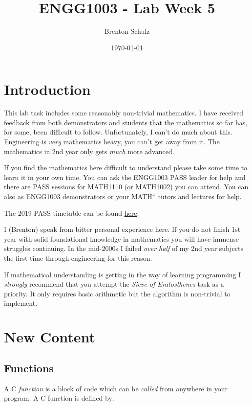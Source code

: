 \documentclass{lab}
\title{ENGG1003 - Lab Week 5}
\author{Brenton Schulz}
\date{\today}
\begin{document}
\maketitle

\section{Introduction}

This lab task includes some reasonably non-trivial mathematics. I have received feedback from both demonstrators and students that the mathematics so far has, for some, been difficult to follow. Unfortunately, I can't do much about this. Engineering is \textit{very} mathematics heavy, you can't get away from it. The mathematics in 2nd year only gets \textit{much} more advanced.

If you find the mathematics here difficult to understand please take some time to learn it in your own time. You can ask the ENGG1003 PASS leader for help and there are PASS sessions for MATH1110 (or MATH1002) you can attend. You can also as ENGG1003 demonstrators or your MATH* tutors and lectures for help.

The 2019 PASS timetable can be found \underline{\href{https://www.newcastle.edu.au/__data/assets/pdf_file/0003/137577/PASS-TT-Callaghan-S1-19.pdf}{here}}.

I (Brenton) speak from bitter personal experience here. If you do not finish 1st year with solid foundational knowledge in mathematics you will have immense struggles continuing. In the mid-2000s I failed \textit{over half} of my 2nd year subjects the first time through engineering for this reason.

If mathematical understanding is getting in the way of learning programming I \textit{strongly} recommend that you attempt the \textit{Sieve of Eratosthenes} task as a priority. It only requires basic arithmetic but the algorithm is non-trivial to implement.%

\pagebreak
\section{New Content}

\subsection{Functions}

A C \textit{function} is a block of code which can be \textit{called} from anywhere in your program. A C function is defined by:
\end{document}

